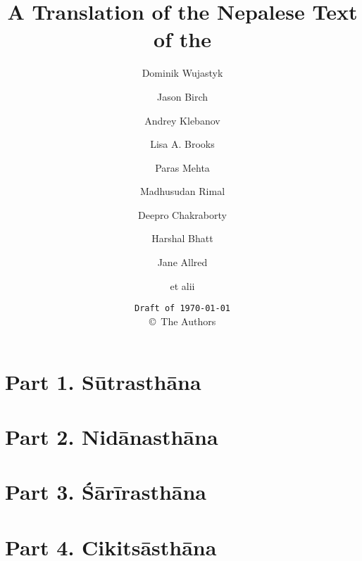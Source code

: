 \documentclass[12pt,draft]{book} %
\title{A Translation of the Nepalese Text of the \SS}
\author{Dominik Wujastyk 
    \and Jason Birch\begin{quote}
        
    \end{quote}
    \and Andrey Klebanov
    \and Lisa A. Brooks 
    \and Paras Mehta 
    \and Madhusudan Rimal
    \and Deepro Chakraborty
    \and Harshal Bhatt
    \and Jane Allred
    \and et alii}
\date{\texttt{Draft of \today}\\ \copyright\ The Authors}
\begin{document}
    
    
        
    \pagecolor{cyan}
    \thispagestyle{empty}
          \maketitle

        \newpage
        \pagecolor{white}
        \tableofcontents
        
        
            \thispagestyle{empty}
        
        \part{Part 1. Sūtrasthāna} 
                        
        
            \thispagestyle{empty}
        
            \thispagestyle{empty}
        
            \thispagestyle{empty}
            \thispagestyle{empty}
            \thispagestyle{empty}
       
            \thispagestyle{empty}
        
            \thispagestyle{empty}
        
        \part{Part 2. Nidānasthāna}
        
        
            \thispagestyle{empty}
        
        \part{Part 3. Śārīrasthāna}
        
            \thispagestyle{empty}
        
        \part{Part 4. Cikitsāsthāna}
        
        
            \thispagestyle{empty}
        
            \thispagestyle{empty}
        
            \thispagestyle{empty}
        
\end{document}
